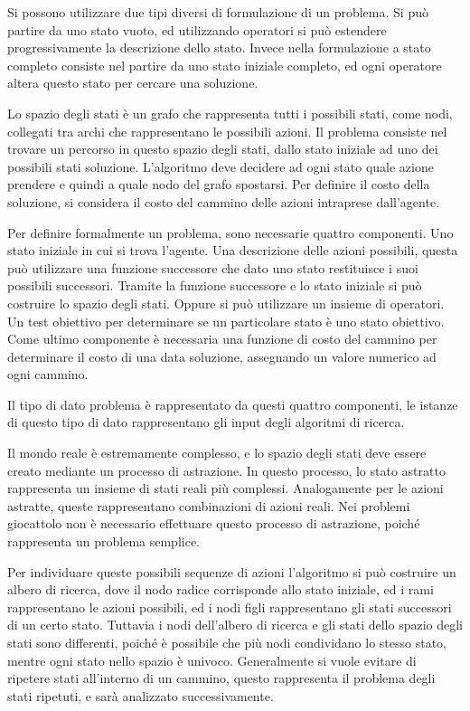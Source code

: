 \documentclass{article}
\numberwithin{equation}{subsection}
\begin{document}
Si possono utilizzare due tipi diversi di formulazione di un problema. Si può partire da uno 
stato vuoto, ed utilizzando operatori si può estendere progressivamente la descrizione 
dello stato. 
Invece nella formulazione a stato completo consiste nel partire da uno stato iniziale completo, 
ed ogni operatore altera questo stato per cercare una soluzione. 


Lo spazio degli stati è un grafo che rappresenta tutti i possibili stati, come nodi, collegati 
tra archi che rappresentano le possibili azioni. Il problema consiste nel trovare un 
percorso in questo spazio degli stati, dallo stato iniziale ad uno dei possibili stati 
soluzione. L'algoritmo deve decidere ad ogni stato quale azione prendere e quindi a quale nodo 
del grafo spostarsi. 
Per definire il costo della soluzione, si considera il costo del cammino delle azioni 
intraprese dall'agente. 

Per definire formalmente un problema, sono necessarie quattro componenti. Uno stato iniziale 
in cui si trova l'agente. Una descrizione delle azioni possibili, questa può utilizzare una 
funzione successore che dato uno stato restituisce i suoi possibili successori. Tramite la 
funzione successore e lo stato iniziale si può costruire lo spazio degli stati. Oppure si 
può utilizzare un insieme di operatori. Un test obiettivo per determinare se un particolare 
stato è uno stato obiettivo. Come ultimo componente è necessaria una funzione di costo del 
cammino per determinare il costo di una data soluzione, assegnando un valore numerico ad 
ogni cammino. 

Il tipo di dato problema è rappresentato da questi quattro componenti, le istanze di questo 
tipo di dato rappresentano gli input degli algoritmi di ricerca. 


Il mondo reale è estremamente complesso, e lo spazio degli stati deve essere creato mediante un 
processo di astrazione. In questo processo, lo stato astratto rappresenta un insieme di 
stati reali più complessi. Analogamente per le azioni astratte, queste rappresentano combinazioni 
di azioni reali. Nei problemi giocattolo non è necessario effettuare questo processo di astrazione, 
poiché rappresenta un problema semplice. 


Per individuare queste possibili sequenze di azioni l'algoritmo si può costruire un albero di 
ricerca, dove il nodo radice corrisponde allo stato iniziale, ed i rami rappresentano 
le azioni possibili, ed i nodi figli rappresentano gli stati successori di un certo stato. 
Tuttavia i nodi dell'albero di ricerca e gli stati dello spazio degli stati sono differenti, poiché 
è possibile che più nodi condividano lo stesso stato, mentre ogni stato nello spazio è univoco. 
Generalmente si vuole evitare di ripetere stati all'interno di un cammino, questo rappresenta il 
problema degli stati ripetuti, e sarà analizzato successivamente. 
\end{document}
